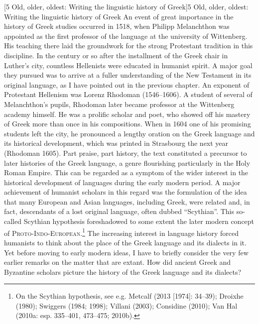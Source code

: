 \documentclass[12pt]{article}
\makeatletter
\renewcommand\section{\@startsection{section}{1}{0.0in}{0.1665in}{0.0835in}{\normalfont\normalsize\fontsize{14pt}{16.8pt}\selectfont\rmfamily\bfseries}}
\newenvironment{styleStandard}{\renewcommand\baselinestretch{1.25}\setlength\leftskip{0in}\setlength\rightskip{0in}\setlength\parindent{0.1972in}\setlength\parfillskip{0pt plus 1fil}\setlength\parskip{0in plus 1pt}\writerlistparindent\writerlistleftskip\leavevmode\normalfont\normalsize\writerlistlabel\ignorespaces}{\unskip\vspace{0in plus 1pt}\par}
\newcommand\writerlistleftskip{}
\newcommand\writerlistparindent{}
\newcommand\writerlistlabel{}
\makeatother
\begin{document}
\clearpage\section[5 Old, older, oldest: Writing the linguistic history of Greek]{\textsc{5 }Old, older, oldest: Writing the linguistic history of Greek}
\hypertarget{Toc19704834}{}\begin{styleStandard}
An event of great importance in the history of Greek studies occurred in 1518, when Philipp Melanchthon was appointed as the first professor of the language at the university of Wittenberg. His teaching there laid the groundwork for the strong Protestant tradition in this discipline. In the century or so after the installment of the Greek chair in Luther’s city, countless Hellenists were educated in humanist spirit. A major goal they pursued was to arrive at a fuller understanding of the New Testament in its original language, as I have pointed out in the previous chapter. An exponent of Protestant Hellenism was Lorenz Rhodoman (1546–1606). A student of several of Melanchthon’s pupils, Rhodoman later became professor at the Wittenberg academy himself. He was a prolific scholar and poet, who showed off his mastery of Greek more than once in his compositions. When in 1604 one of his promising students left the city, he pronounced a lengthy oration on the Greek language and its historical development, which was printed in Strasbourg the next year (Rhodoman 1605). Part praise, part history, the text constituted a precursor to later histories of the Greek language, a genre flourishing particularly in the Holy Roman Empire. This can be regarded as a symptom of the wider interest in the historical development of languages during the early modern period. A major achievement of humanist scholars in this regard was the formulation of the idea that many European and Asian languages, including Greek, were related and, in fact, descendants of a lost original language, often dubbed “Scythian”. This so-called Scythian hypothesis foreshadowed to some extent the later modern concept of \textsc{Proto-Indo-European}.\footnote{ On the Scythian hypothesis, see e.g. Metcalf (2013 [1974]: 34–39); Droixhe (1980); Swiggers (1984; 1998); Villani (2003); Considine (2010); Van Hal (2010a: esp. 335–401, 473–475; 2010b).} The increasing interest in language history forced humanists to think about the place of the Greek language and its dialects in it. Yet before moving to early modern ideas, I have to briefly consider the very few earlier remarks on the matter that are extant. How did ancient Greek and Byzantine scholars picture the history of the Greek language and its dialects?
\end{styleStandard}
\end{document}
